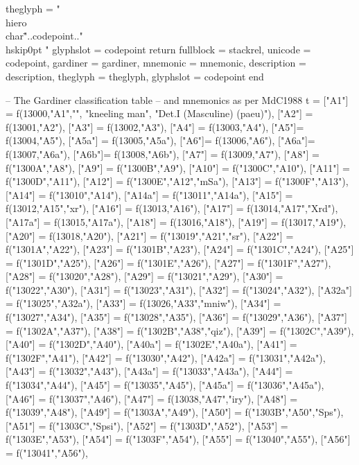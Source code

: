 \documentclass{article}
\begin{document}
\begin{luacode*}
theglyph = " \\hiero\\char\""..codepoint.."\\hskip0pt "
  glyphslot = codepoint
return {  fullblock = stackrel, 
          unicode   = codepoint,
          gardiner  = gardiner,
          mnemonic  = mnemonic,
          description = description,
          theglyph  = theglyph,
          glyphslot = codepoint}
end

-- The Gardiner classification table
-- and mnemonics as per MdC1988 
t ={
	["A1"]  = f(13000,"A1","",
               "kneeling man",
               "Det.I (Masculine) (paeu)"),
   ["A2"] = f(13001,"A2"),
   ["A3"] = f(13002,"A3"),
	["A4"] = f(13003,"A4"),
   ["A5"]= f(13004,"A5"),  
	["A5a"] = f(13005,"A5a"),
	["A6"]= f(13006,"A6"),
	["A6a"]= f(13007,"A6a"),
	["A6b"]= f(13008,"A6b"),
   ["A7"] = f(13009,"A7"),
	["A8"] = f("1300A","A8"),
	["A9"] = f("1300B","A9"),
	["A10"] = f("1300C","A10"),
	["A11"] = f("1300D","A11"),
	["A12"] = f("1300E","A12","mSa"),
	["A13"] = f("1300F","A13"),
	["A14"] = f("13010","A14"),
	["A14a"] = f("13011","A14a"),
  	["A15"] = f(13012,"A15","xr"),
  	["A16"] = f(13013,"A16"),
  	["A17"] = f(13014,"A17","Xrd"),
  	["A17a"] = f(13015,"A17a"),
  	["A18"] = f(13016,"A18"),
  	["A19"] = f(13017,"A19"),
  	["A20"] = f(13018,"A20"),
  	["A21"] = f("13019","A21","sr"),
  	["A22"] = f("1301A","A22"),
  	["A23"] = f("1301B","A23"),
  	["A24"] = f("1301C","A24"),
  	["A25"] = f("1301D","A25"),
  	["A26"] = f("1301E","A26"),
  	["A27"] = f("1301F","A27"),
  	["A28"] = f("13020","A28"),
  	["A29"] = f("13021","A29"),
  	["A30"] = f("13022","A30"),
  	["A31"] = f("13023","A31"),
  	["A32"] = f("13024","A32"),
 	["A32a"] = f("13025","A32a"),
  	["A33"] = f(13026,"A33","mniw"),
	["A34"] = f("13027","A34"),
	["A35"] = f("13028","A35"),
	["A36"] = f("13029","A36"),
	["A37"] = f("1302A","A37"),
	["A38"] = f("1302B","A38","qiz"),
	["A39"] = f("1302C","A39"),
	["A40"] = f("1302D","A40"),
	["A40a"] = f("1302E","A40a"),
	["A41"] = f("1302F","A41"),
	["A42"] = f("13030","A42"),
	["A42a"] = f("13031","A42a"),
	["A43"] = f("13032","A43"),
	["A43a"] = f("13033","A43a"),
	["A44"] = f("13034","A44"),
	["A45"] = f("13035","A45"),
	["A45a"] = f("13036","A45a"),
	["A46"] = f("13037","A46"),
  	["A47"] = f(13038,"A47","iry"),
	["A48"] = f("13039","A48"),
	["A49"] = f("1303A","A49"),
  	["A50"] = f("1303B","A50","Sps"),
  	["A51"] = f("1303C","Spsi"),
	["A52"] = f("1303D","A52"),
	["A53"] = f("1303E","A53"),
	["A54"] = f("1303F","A54"),
	["A55"] = f("13040","A55"),
	["A56"] = f("13041","A56"),
}
\end{luacode*}
\end{document}
